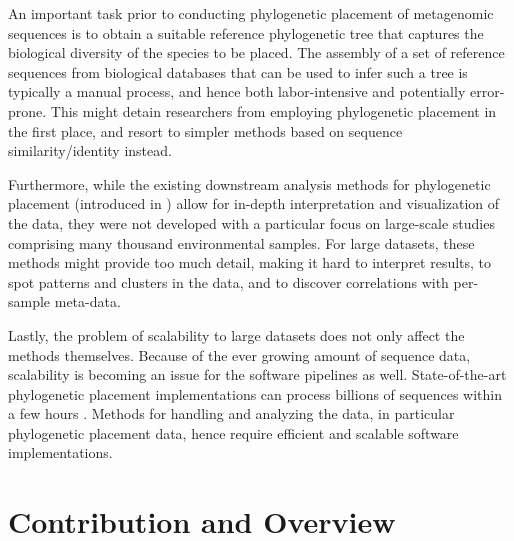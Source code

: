 An important task prior to conducting phylogenetic placement of metagenomic sequences is to obtain a suitable
reference phylogenetic tree that captures the biological diversity of the species to be placed.
The assembly of a set of reference sequences from biological databases that can be used to infer such a tree
is typically a manual process, and hence both labor-intensive and potentially error-prone.
This might detain researchers from employing phylogenetic placement in the first place,
and resort to simpler methods based on sequence similarity/identity instead.

Furthermore, while the existing downstream analysis methods for phylogenetic placement
(introduced in )
allow for in-depth interpretation and visualization of the data,
they were not developed with a particular focus on large-scale studies comprising many thousand environmental samples.
For large datasets, these methods might provide too much detail,
making it hard to interpret results, to spot patterns and clusters in the data,
and to discover correlations with per-sample meta-data.

Lastly, the problem of scalability to large datasets does not only affect the methods themselves.
Because of the ever growing amount of sequence data,
scalability is becoming an issue for the software pipelines as well.
State-of-the-art phylogenetic placement implementations can process billions of sequences within a few hours \cite{Barbera2018}.
Methods for handling and analyzing the data, in particular phylogenetic placement data,
hence require efficient and scalable software implementations.



\section{Contribution and Overview}
\label{ch:Introduction:sec:ContributionOverview}

